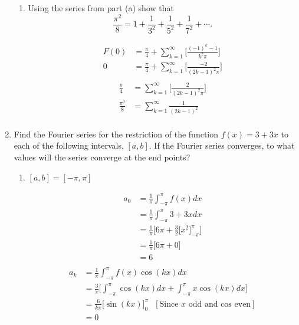 \documentclass{article}
\begin{document}
\begin{enumerate}
\begin{enumerate}
\item Using the series from part (a) show that 
\[
\frac{\pi^2}{8} = 1 + \frac{1}{3^2} + \frac{1}{5^2} + \frac{1}{7^2} + \cdots .
\]

\begin{multicols}{2}
\noindent
\begin{align*}
        F(0) &= \frac{\pi}{4} + \sum^{\infty}_{k=1}\Bigg[ \frac{(-1)^k-1}{k^2\pi} \Bigg] \\ 
        0 &= \frac{\pi}{4} + \sum^{\infty}_{k=1}\Bigg[ \frac{-2}{(2k - 1)^2\pi} \Bigg] \\
        \end{align*}
        \begin{align*}
         \frac{\pi}{4} &= \sum^{\infty}_{k=1}\Bigg[ \frac{2}{(2k - 1)^2\pi} \Bigg] \\
         \frac{\pi^2}{8} &= \sum^{\infty}_{k=1} \frac{1}{(2k - 1)^2} \\
\end{align*}
\end{multicols}
\end{enumerate}
\newpage
\item Find the Fourier series for the restriction of the function $f(x) = 3 + 3x$ to each of the following intervals, $[a,b]$. If the Fourier series converges, to what values will the series converge at the end points?
\begin{enumerate}
\item $[a,b] = [-\pi, \pi] $
\begin{multicols}{2}
\noindent
\begin{align*}
    a_0 &= \frac{1}{\pi} \int_{-\pi}^{\pi}f(x) dx \\
    &= \frac{1}{\pi} \int_{-\pi}^{\pi}3 + 3x dx \\
    &= \frac{1}{\pi} \Bigg[6\pi +  \frac{3}{2}\Big[x^2\Big]^{\pi}_{-\pi}\Bigg] \\
    &= \frac{1}{\pi} \Bigg[6\pi + 0 \Bigg] \\
    &= 6\\
\end{align*}
\begin{align*}
    a_k &= \frac{1}{\pi} \int_{-\pi}^{\pi}f(x)\cos(kx) dx \\
    &= \frac{3}{\pi}\Bigg[ \int_{-\pi}^{\pi}\cos(kx) dx + \int_{-\pi}^{\pi}x\cos(kx) dx \Bigg] \\
    &= \frac{6}{k\pi}\Big[\sin(kx)\Big]_{0}^{\pi} \: \: \: [\text{Since $x$ odd and cos even}] \\
    &= 0
\end{align*}

\end{multicols}
\end{enumerate}
\end{enumerate}
\end{document}
